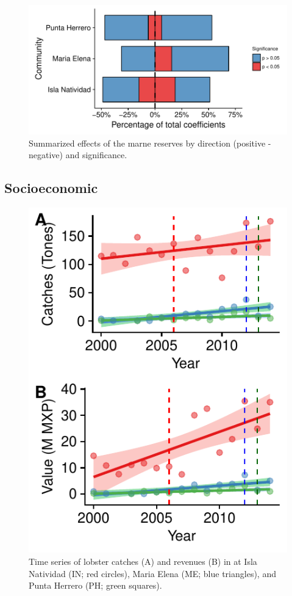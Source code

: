 \documentclass{frontiersSCNS}
\theoremstyle{definition}
\theoremstyle{definition}
\theoremstyle{definition}
\theoremstyle{remark}
\begin{document}
\begin{figure}
\centering
\includegraphics{Villasenor-Derbez_files/figure-latex/unnamed-chunk-5-1.pdf}
\caption{\label{fig:unnamed-chunk-5}\label{fig:res_com}Summarized effects of
the marne reserves by direction (positive - negative) and significance.}
\end{figure}

\subsection{Socioeconomic}\label{socioeconomic}

\begin{figure}
\centering
\includegraphics{Villasenor-Derbez_files/figure-latex/unnamed-chunk-6-1.pdf}
\caption{\label{fig:unnamed-chunk-6}\label{fig:lobsters}Time series of
lobster catches (A) and revenues (B) in at Isla Natividad (IN; red
circles), Maria Elena (ME; blue triangles), and Punta Herrero (PH; green
squares).}
\end{figure}
\end{document}
